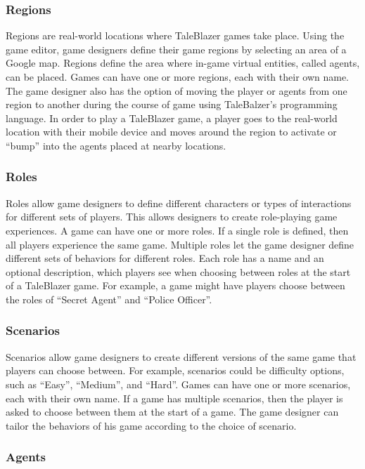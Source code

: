\subsubsection{Regions}

Regions are real-world locations where TaleBlazer games take place. Using the game editor, game designers define their game regions by selecting an area of a Google map. Regions define the area where in-game virtual entities, called agents, can be placed. Games can have one or more regions, each with their own name. The game designer also has the option of moving the player or agents from one region to another during the course of game using TaleBalzer's programming language. In order to play a TaleBlazer game, a player goes to the real-world location with their mobile device and moves around the region to activate or ``bump'' into the agents placed at nearby locations. 

\subsubsection{Roles}

Roles allow game designers to define different characters or types of interactions for different sets of players. This allows designers to create role-playing game experiences. A game can have one or more roles. If a single role is defined, then all players experience the same game. Multiple roles let the game designer define different sets of behaviors for different roles. Each role has a name and an optional description, which players see when choosing between roles at the start of a TaleBlazer game. For example, a game might have players choose between the roles of ``Secret Agent'' and ``Police Officer''.

\subsubsection{Scenarios}

Scenarios allow game designers to create different versions of the same game that players can choose between. For example, scenarios could be difficulty options, such as ``Easy'', ``Medium'', and ``Hard''. Games can have one or more scenarios, each with their own name. If a game has multiple scenarios, then the player is asked to choose between them at the start of a game. The game designer can tailor the behaviors of his game according to the choice of scenario. 

\subsubsection{Agents}


